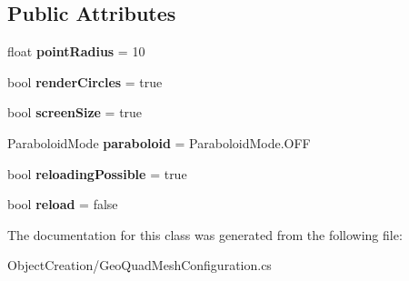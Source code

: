 \subsection*{Public Attributes}
\begin{DoxyCompactItemize}
\item 
\mbox{\label{class_object_creation_1_1_geo_quad_mesh_configuration_aff59f06e3541855f30b70d4d589c64d4}} 
float {\bfseries point\+Radius} = 10
\item 
\mbox{\label{class_object_creation_1_1_geo_quad_mesh_configuration_a9b7234402b85c6dbb4c7f8620d381247}} 
bool {\bfseries render\+Circles} = true
\item 
\mbox{\label{class_object_creation_1_1_geo_quad_mesh_configuration_a093c1cdd45e0daea6daf3023aff7b7f3}} 
bool {\bfseries screen\+Size} = true
\item 
\mbox{\label{class_object_creation_1_1_geo_quad_mesh_configuration_a1c427af67f0caba9bef241dca7288b7d}} 
Paraboloid\+Mode {\bfseries paraboloid} = Paraboloid\+Mode.\+O\+FF
\item 
\mbox{\label{class_object_creation_1_1_geo_quad_mesh_configuration_ab055ea50c12df3cf1917221f824b9656}} 
bool {\bfseries reloading\+Possible} = true
\item 
\mbox{\label{class_object_creation_1_1_geo_quad_mesh_configuration_ace6bec46c5c6c315462d389ac172e67e}} 
bool {\bfseries reload} = false
\end{DoxyCompactItemize}


The documentation for this class was generated from the following file\+:\begin{DoxyCompactItemize}
\item 
Object\+Creation/Geo\+Quad\+Mesh\+Configuration.\+cs\end{DoxyCompactItemize}

